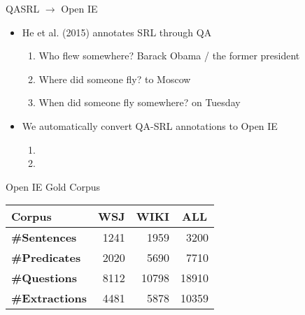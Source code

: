 \documentclass[final]{beamer}
\newcommand{\commonvspace}[0]{\vspace{1cm}}
\begin{document}
\begin{frame}{}
\begin{textblock}{39}
\commonvspace

\begin{block}{QASRL $\rightarrow$ Open IE}
  \begin{itemize}
        \setlength\itemsep{1em}
  \item He et al. (2015) annotates \alert{SRL} through QA
    \\ 
    \begin{enumerate}
    \item Who flew somewhere? \alert{Barack Obama} / \alert{the former president}
    \item Where did someone fly?  \alert{to Moscow}
    \item When did someone fly somewhere? \alert{on Tuesday}
    \end{enumerate}
  \item We \alert{automatically} convert QA-SRL annotations to Open IE
    \begin{enumerate}
    \item {}
    \item {}
    \end{enumerate}
  \end{itemize}
\end{block}

\commonvspace

\begin{block}{Open IE Gold Corpus}
  \begin{table}
    \begin{tabular}{lrrr}
      \hline
      \textbf{Corpus}        & \multicolumn{1}{c}{\textbf{WSJ}} & \multicolumn{1}{c}{\textbf{WIKI}} & \multicolumn{1}{c}{\textbf{ALL}} \\ \hline
      \textbf{\#Sentences}   & 1241                              & 1959                               & 3200                              \\ 
      \textbf{\#Predicates}  & 2020                              & 5690                               & 7710                              \\ 
      \textbf{\#Questions}   & 8112                              & 10798                              & 18910                             \\ 
      \textbf{\#Extractions} & 4481                     & 5878                      & 10359                    \\ \hline
    \end{tabular}
    \label{tab:cstats}
  \end{table}
  \end{block}


\end{textblock}
\end{frame}
\end{document}
